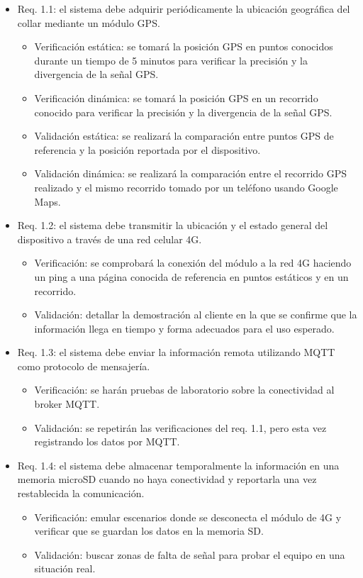 \documentclass[
11pt, %
]{charter}
\begin{document}
\begin{itemize}
	\item Req. 1.1: el sistema debe adquirir periódicamente la ubicación geográfica del collar mediante un módulo GPS.
	\begin{itemize}
		\item Verificación estática: se tomará la posición GPS en puntos conocidos durante un tiempo de 5 minutos para verificar la precisión y la divergencia de la señal GPS.
		\item Verificación dinámica: se tomará la posición GPS en un recorrido conocido para verificar la precisión y la divergencia de la señal GPS.
		\item Validación estática: se realizará la comparación entre puntos GPS de referencia y la posición reportada por el dispositivo.
		\item Validación dinámica: se realizará la comparación entre el recorrido GPS realizado y el mismo recorrido tomado por un teléfono usando Google Maps.
	\end{itemize}

	\item Req. 1.2: el sistema debe transmitir la ubicación y el estado general del dispositivo a través de una red celular 4G.
	\begin{itemize}
		\item Verificación: se comprobará la conexión del módulo a la red 4G haciendo un ping a una página conocida de referencia en puntos estáticos y en un recorrido.
		\item Validación: detallar la demostración al cliente en la que se confirme que la información llega en tiempo y forma adecuados para el uso esperado.
	\end{itemize}

	\item Req. 1.3: el sistema debe enviar la información remota utilizando MQTT como protocolo de mensajería.
	\begin{itemize}
		\item Verificación: se harán pruebas de laboratorio sobre la conectividad al broker MQTT.
		\item Validación: se repetirán las verificaciones del req. 1.1, pero esta vez registrando los datos por MQTT.
	\end{itemize}

	\item Req. 1.4: el sistema debe almacenar temporalmente la información en una memoria microSD cuando no haya conectividad y reportarla una vez restablecida la comunicación.
	\begin{itemize}
		\item Verificación: emular escenarios donde se desconecta el módulo de 4G y verificar que se guardan los datos en la memoria SD.
		\item Validación: buscar zonas de falta de señal para probar el equipo en una situación real.
	\end{itemize}


\end{itemize}
\end{document}
